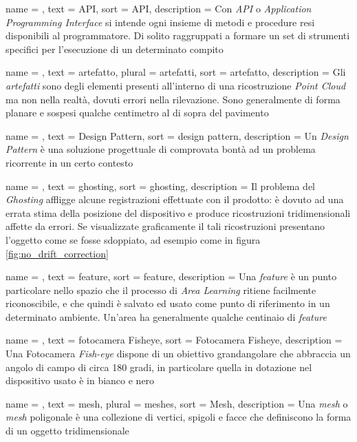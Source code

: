  {
	name = ,
	text = API,
	sort = API,
	description = {Con \emph{API} o \emph{Application Programming Interface} si intende ogni insieme di metodi e procedure resi disponibili al programmatore. Di solito raggruppati a formare un set di strumenti specifici per l'esecuzione di un determinato compito}
}

 {
	name = ,
	text = artefatto,
	plural = artefatti,
	sort = artefatto,
	description = {Gli \emph{artefatti} sono degli elementi presenti all'interno di una ricostruzione \emph{Point Cloud} ma non nella realtà, dovuti errori nella rilevazione. Sono generalmente di forma planare e sospesi qualche centimetro al di sopra del pavimento}
}

 {
	name = ,
	text = Design Pattern,
	sort = design pattern,
	description = {Un \emph{Design Pattern} è una soluzione progettuale di comprovata bontà ad un problema ricorrente in un certo contesto}
}

 {
	name = ,
	text = ghosting,
	sort = ghosting,
	description = {Il problema del \emph{Ghosting} affligge alcune registrazioni effettuate con il prodotto: è dovuto ad una errata stima della posizione del dispositivo e produce ricostruzioni tridimensionali affette da errori. Se visualizzate graficamente il tali ricostruzioni presentano l'oggetto come se fosse sdoppiato, ad esempio come in figura \ref{fig:no_drift_correction}}
}

 {
	name = ,
	text = feature,
	sort = feature,
	description = {Una \emph{feature} è un punto particolare nello spazio che il processo di \emph{Area Learning} ritiene facilmente riconoscibile, e che quindi è salvato ed usato come punto di riferimento in un determinato ambiente. Un'area ha generalmente qualche centinaio di \emph{feature}}
}

 {
	name = ,
	text = fotocamera Fisheye,
	sort = Fotocamera Fisheye,
	description = {Una Fotocamera \emph{Fish-eye} dispone di un obiettivo grandangolare che abbraccia un angolo di campo di circa 180 gradi, in particolare quella in dotazione nel dispositivo usato è in bianco e nero}
}	

 {
	name = ,
	text = mesh,
	plural = meshes,
	sort = Mesh,
	description = {Una \emph{mesh} o \emph{mesh} poligonale è una collezione di vertici, spigoli e facce che definiscono la forma di un oggetto tridimensionale}
}	

